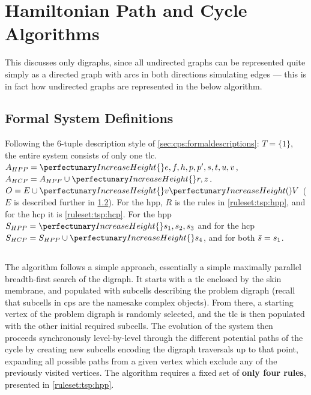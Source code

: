 \section{ Hamiltonian Path and Cycle Algorithms}\label{sec:tsp:algohpp}
This  discusses only digraphs, since all undirected graphs can be represented quite simply as a directed graph with arcs in both directions simulating edges --- this is in fact how undirected graphs are represented in the below algorithm.

\subsection{Formal System Definitions}

Following the 6-tuple description style of \cref{sec:cps:formaldescriptions}:  \(T = \{1\}\), \ie{} the entire system consists of only one \gls{tlc}.  \(A_{HPP} = \cpset{e, f, h, p, p', s, t, u, v}\), \(A_{HCP} = A_{HPP} \cup \cpset{r, z}\).  \(O = E \cup \cpset{\cpfunc{v}{V}}\) (\(E\) is described further in \cref{sec:tsp:hpp}).  For the \gls{hpp}, \(R\) is the rules in \cref{ruleset:tsp:hpp}, and for the \gls{hcp} it is \cref{ruleset:tsp:hcp}.  For the \gls{hpp} \(S_{HPP} = \cpset{s_1, s_2, s_3}\) and for the \gls{hcp} \(S_{HCP} = S_{HPP} \cup \cpset{s_4}\), and for both \(\Bar{s} = s_1\).



\subsection{}\label{sec:tsp:hpp}

The algorithm follows a simple approach, essentially a simple maximally parallel breadth-first search of the digraph.  It starts with a \gls{tlc} enclosed by the skin membrane, and populated with subcells describing the problem digraph (recall that subcells in \gls{cps} are the namesake complex objects).  From there, a starting vertex of the problem digraph is randomly selected, and the \gls{tlc} is then populated with the other initial required subcells.  The evolution of the system then proceeds synchronously level-by-level through the different potential paths of the cycle by creating new subcells encoding the digraph traversals up to that point, expanding all possible paths from a given vertex which exclude any of the previously visited vertices.  The algorithm requires a fixed set of \textbf{only four rules}, presented in \cref{ruleset:tsp:hpp}.

